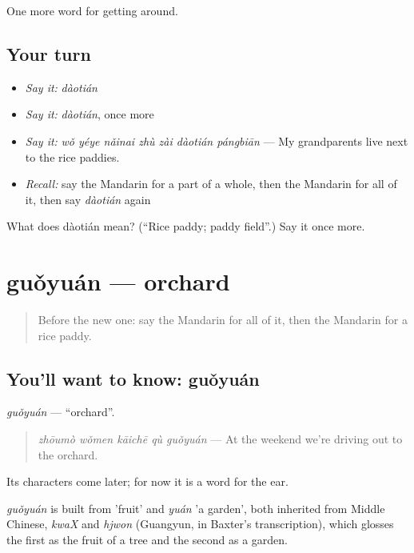 \begin{grammarlens}[title={What you've built}]
One more word for getting around.
\end{grammarlens}

\subsection*{Your turn}
\begin{itemize}
\raggedright
  \item \emph{Say it:} \emph{dàotián}
  \item \emph{Say it:} \emph{dàotián}, once more
  \item \emph{Say it:} \emph{wǒ yéye nǎinai zhù zài dàotián pángbiān} — My grandparents live next to the rice paddies.
  \item \emph{Recall:} say the Mandarin for a part of a whole, then the Mandarin for all of it, then say \emph{dàotián} again
\end{itemize}

\begin{tcolorbox}[breakable,colback=teal!4,colframe=teal!35!black,title={Before you move on}]
What does dàotián mean? (\textquotedblleft{}Rice paddy; paddy field\textquotedblright{}.) Say it once more.
\end{tcolorbox}
\section[guǒyuán]{guǒyuán — orchard}

\label{lesson:ZH-C439-guoyuan}



\begin{quote}
Before the new one: say the Mandarin for all of it, then the Mandarin for a rice paddy.
\end{quote}

\subsection*{You'll want to know: guǒyuán}
\emph{guǒyuán} — \textquotedblleft{}orchard\textquotedblright{}.

\begin{quote}
\emph{zhōumò wǒmen kāichē qù guǒyuán} — At the weekend we're driving out to the orchard.
\end{quote}

Its characters come later; for now it is a word for the ear.

\begin{cousinweb}
\emph{guǒyuán} is built from  'fruit' and \emph{yuán} 'a garden', both inherited from Middle Chinese, \emph{kwaX} and \emph{hjwon} (Guangyun, in Baxter's transcription), which glosses the first as the fruit of a tree and the second as a garden.
\end{cousinweb}

